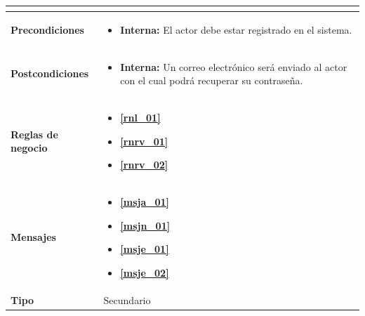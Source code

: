 \begin{center}
\begin{longtable}{| p{3.5cm} | p{11.5cm} |}
\begin{itemize}
            \end{itemize} \\
        \hline	
          \textbf{Precondiciones}& 
            \begin{itemize}
              \item \textbf{Interna:} El actor debe estar registrado en el sistema.
            \end{itemize} \\
        \hline	
          \textbf{Postcondiciones} & 
            \begin{itemize}
              \item \textbf{Interna:} Un correo electrónico será enviado al actor con el cual podrá recuperar su contraseña.
            \end{itemize} \\
       \hline    
          \textbf{Reglas de negocio} & 
          \begin{itemize}
         	  \item \textbf{\ref{rnl_01}}
         	  \item \textbf{\ref{rnrv_01}}
         	  \item \textbf{\ref{rnrv_02}}
	 \end{itemize} \\
       \hline
          \textbf{Mensajes} & 
         	\begin{itemize}
         	  \item \textbf{\ref{msja_01}}
         	  \item \textbf{\ref{msjn_01}}
         	  \item \textbf{\ref{msje_01}}
         	  \item \textbf{\ref{msje_02}}
	 \end{itemize} \\
       \hline
          \textbf{Tipo} & Secundario \\
       \hline	    
  \end{longtable}
\end{center}
\endgroup

